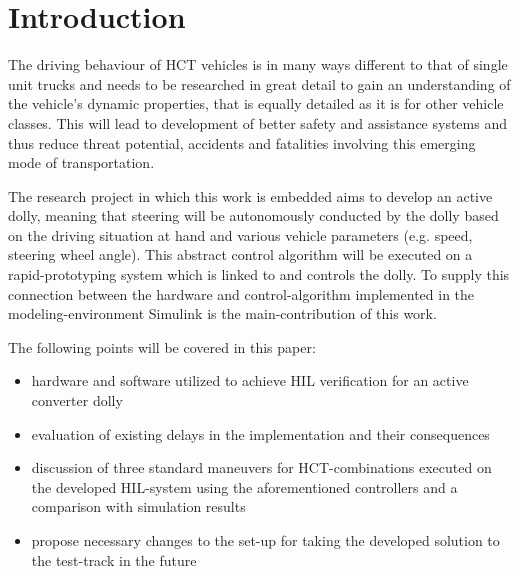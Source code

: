 \documentclass[root.tex]{subfiles}
\begin{document}
{\pagestyle{empty}}
\section{Introduction}
\label{chap:introduction}
The driving behaviour of \gls{HCT} vehicles is in many ways different to that of single unit trucks and needs to be researched in great detail to gain an understanding of the vehicle's dynamic properties, that is equally detailed as it is for other vehicle classes. This will lead to development of better safety and assistance systems and thus reduce threat potential, accidents and fatalities involving this emerging mode of transportation. 

The research project in which this work is embedded aims to develop an active dolly, meaning that steering will be autonomously conducted by the dolly based on the driving situation at hand and various vehicle parameters (e.g. speed, steering wheel angle).
This abstract control algorithm will be executed on a rapid-prototyping system which is linked to and controls the dolly. To supply this connection between the hardware and control-algorithm implemented in the modeling-environment Simulink is the main-contribution of this work. 


The following points will be covered in this paper:
\begin{itemize}
	\item hardware and software utilized to achieve \gls{HIL} verification for an active converter dolly
	\item evaluation of existing delays in the implementation and their consequences
	\item discussion of three standard maneuvers for \gls{HCT}-combinations executed on the  developed \gls{HIL}-system using the aforementioned controllers and a comparison with simulation results
	\item propose necessary changes to the set-up for taking the developed solution to the test-track in the future
\end{itemize}
\end{document}
